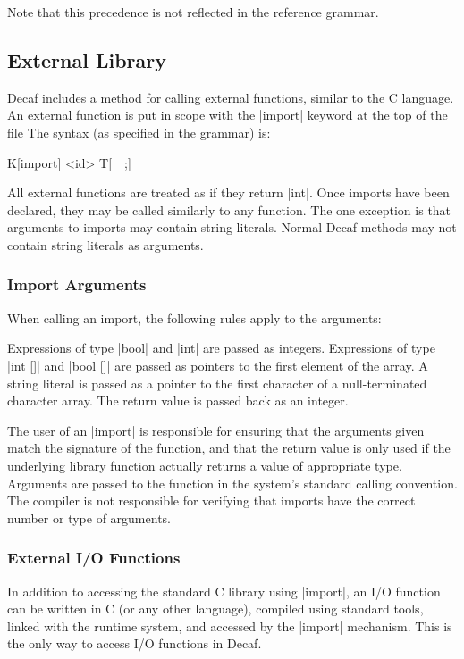 \documentclass[11pt]{article}
\begin{document}
Note that this precedence is not reflected in the reference grammar.

\subsection{External Library}
\label{sec:external-library}

Decaf includes a method for calling external functions, similar to the C language.
An external function is put in scope with the \decaf|import| keyword at the top of the file
The syntax (as specified in the grammar) is:

{\bnf  K[import] <id> T[~~;] }

All external functions are treated as if they return \decaf|int|.
Once imports have been declared, they may be called similarly to any function.
The one exception is that arguments to imports may contain string literals.
Normal Decaf methods may not contain string literals as arguments.

\subsubsection{Import Arguments}
When calling an import, the following rules apply to the arguments:

Expressions of type \decaf|bool| and \decaf|int| are passed as integers.
Expressions of type \decaf|int []| and \decaf|bool []| are passed as pointers to the first element of the array.
A string literal is passed as a pointer to the first character of a null-terminated character array.
The return value is passed back as an integer.

The user of an \decaf|import| is responsible for ensuring that the arguments given match the signature of the function, and that the return value is only used if the underlying library function actually returns a value of appropriate type.
Arguments are passed to the function in the system's standard calling convention.
The compiler is not responsible for verifying that imports have the correct number or type of arguments.

\subsubsection{External I/O Functions}
In addition to accessing the standard C library using \decaf|import|, an I/O function can be written in C (or any other language), compiled using standard tools, linked with the runtime system, and accessed by the \decaf|import| mechanism.
This is the only way to access I/O functions in Decaf.
\end{document}
